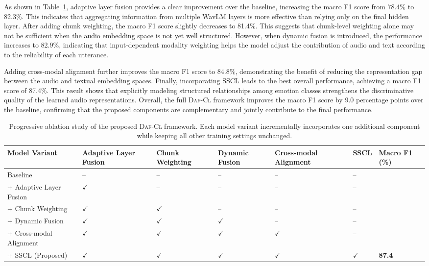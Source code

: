 As shown in Table~\ref{tab:ablation}, adaptive layer fusion provides a clear improvement over the baseline, increasing the macro F1 score from 78.4\% to 82.3\%. This indicates that aggregating information from multiple WavLM layers is more effective than relying only on the final hidden layer. After adding chunk weighting, the macro F1 score slightly decreases to 81.4\%. This suggests that chunk-level weighting alone may not be sufficient when the audio embedding space is not yet well structured. However, when dynamic fusion is introduced, the performance increases to 82.9\%, indicating that input-dependent modality weighting helps the model adjust the contribution of audio and text according to the reliability of each utterance.

Adding cross-modal alignment further improves the macro F1 score to 84.8\%, demonstrating the benefit of reducing the representation gap between the audio and textual embedding spaces. Finally, incorporating SSCL leads to the best overall performance, achieving a macro F1 score of 87.4\%. This result shows that explicitly modeling structured relationships among emotion classes strengthens the discriminative quality of the learned audio representations. Overall, the full \textsc{Daf-Cl} framework improves the macro F1 score by 9.0 percentage points over the baseline, confirming that the proposed components are complementary and jointly contribute to the final performance.

\begin{table}[ht]
	\centering
	\caption{Progressive ablation study of the proposed \textsc{Daf-Cl} framework. Each model variant incrementally incorporates one additional component while keeping all other training settings unchanged.}
	\label{tab:ablation}
	\begin{tabular}{
			|l|
			>{\centering\arraybackslash}m{}|
			>{\centering\arraybackslash}m{}|
			>{\centering\arraybackslash}m{}|
			>{\centering\arraybackslash}m{}|
			>{\centering\arraybackslash}m{}|
			>{\centering\arraybackslash}m{}|
		}
		\hline
		\textbf{Model Variant} &
		\textbf{Adaptive Layer Fusion} &
		\textbf{Chunk Weighting} &
		\textbf{Dynamic Fusion} &
		\textbf{Cross-modal Alignment} &
		\textbf{SSCL} &
		\textbf{Macro F1 (\%)} \\
		\hline
		Baseline &
		-- & -- & -- & -- & -- &
		78.4 \\
		\hline
		+ Adaptive Layer Fusion &
		$\checkmark$ & -- & -- & -- & -- &
		82.3 \\
		\hline
		+ Chunk Weighting &
		$\checkmark$ & $\checkmark$ & -- & -- & -- &
		81.4 \\
		\hline
		+ Dynamic Fusion &
		$\checkmark$ & $\checkmark$ & $\checkmark$ & -- & -- &
		82.9 \\
		\hline
		+ Cross-modal Alignment &
		$\checkmark$ & $\checkmark$ & $\checkmark$ & $\checkmark$ & -- &
		84.8 \\
		\hline
		+ SSCL (Proposed) &
		$\checkmark$ & $\checkmark$ & $\checkmark$ & $\checkmark$ & $\checkmark$ &
		\textbf{87.4} \\
		\hline
	\end{tabular}
\end{table}


